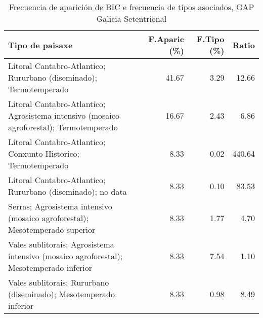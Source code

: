 \begin{table}[p]
\centering
\caption{Frecuencia de aparición de BIC e frecuencia de tipos asociados, GAP Galicia Setentrional} 
\label{vbic10}
\begin{tabular}{lrrr}
  \hline
Tipo de paisaxe & F.Aparic (\%) & F.Tipo (\%) & Ratio \\ 
  \hline
Litoral Cantabro-Atlantico; Rururbano (diseminado); Termotemperado & 41.67 & 3.29 & 12.66 \\ 
  Litoral Cantabro-Atlantico; Agrosistema intensivo (mosaico agroforestal); Termotemperado & 16.67 & 2.43 & 6.86 \\ 
  Litoral Cantabro-Atlantico; Conxunto Historico; Termotemperado & 8.33 & 0.02 & 440.64 \\ 
  Litoral Cantabro-Atlantico; Rururbano (diseminado); no data & 8.33 & 0.10 & 83.53 \\ 
  Serras; Agrosistema intensivo (mosaico agroforestal); Mesotemperado superior & 8.33 & 1.77 & 4.70 \\ 
  Vales sublitorais; Agrosistema intensivo (mosaico agroforestal); Mesotemperado inferior & 8.33 & 7.54 & 1.10 \\ 
  Vales sublitorais; Rururbano (diseminado); Mesotemperado inferior & 8.33 & 0.98 & 8.49 \\ 
   \hline
\end{tabular}
\end{table}
